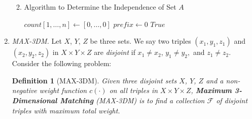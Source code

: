 \documentclass[12pt,a4paper]{article}
\makeatletter
\newtheorem*{solution}{Solution}
\newtheorem{definition}{Definition}
\theoremstyle{definition}
\renewenvironment{solution}[1][Solution] {\par\pushQED{\qed}\normalfont\topsep6\p@\@plus6\p@\relax\trivlist\item[\hskip\labelsep\bfseries#1\@addpunct{.}]\ignorespaces}{\popQED\endtrivlist\@endpefalse} \makeatother
\makeatother
\begin{document}
\begin{enumerate}
\begin{enumerate}
\begin{solution}
        \begin{minipage}[t]{0.8\textwidth}
        \begin{algorithm}[H]
        		
        \BlankLine
        \caption{Algorithm to Determine the Independence of Set $A$}
        \label{judgement}
        $count[1,\dots, n]\leftarrow[0,\dots,0]$\;
        $prefix\leftarrow 0$\;
        \Return $True$\;
        \end{algorithm}
        \end{minipage}
        
    \end{solution}
    \end{enumerate}

\item \textit{MAX-3DM.} Let $X$, $Y$, $Z$ be three sets. We say two triples $\left(x_{1}, y_{1}, z_{1}\right)$ and $\left(x_{2}, y_{2}, z_{2}\right)$ in $X \times Y \times Z$ are \textit{disjoint} if $x_{1} \neq x_{2}$, $y_{1} \neq y_{2},$ and $z_{1} \neq z_{2}$. Consider the following problem:
    
    \begin{definition}[MAX-3DM] 
        Given three disjoint sets $X$, $Y$, $Z$ and a non-negative weight function $c(\cdot)$ on all triples in $X \times Y \times Z$, \textbf{Maximum 3-Dimensional Matching} (MAX-3DM) is to find a collection $\mathcal{F}$ of disjoint triples with maximum total weight.
    \end{definition}


\end{enumerate}
\end{document}
